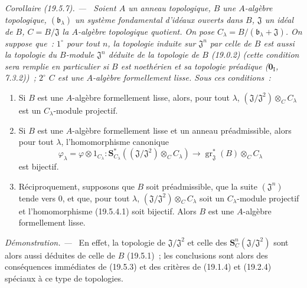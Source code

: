 \documentclass[10pt,oneside]{book}
\makeatletter
\newcommand{\gr}{\operatorname{gr}}
\newcommand{\setmanualcurrentlabel}[1]{\def\@currentlabel{#1}}
\newcommand{\oldpage}[2][]{%
  \setcounter{footnote}{0}%
  \marginpar{\scriptsize\textbf{#1}~|~#2}\ignorespaces}
\newenvironment{corollary}[1][]{%
  \setmanualcurrentlabel{#1}\par\medskip\noindent\itshape Corollaire (#1). ---\ }{\par}
\newenvironment{proof}{%
  \par\medskip\noindent\textit{Démonstration. ---\ }}{\par}
\makeatother
\begin{document}
\begin{corollary}[19.5.7]
\label{0.19.5.7-fr}
Soient $A$ un anneau topologique, $B$ une $A$-algèbre topologique,
$(\mathfrak b_\lambda)$ un système fondamental d'idéaux ouverts dans $B$,
$\mathfrak J$ un idéal de $B$, $C=B/\mathfrak J$ la $A$-algèbre topologique
quotient. On pose $C_\lambda=B/(\mathfrak b_\lambda+\mathfrak J)$. On suppose
que~: $1^\circ$ pour tout $n$, la topologie induite sur $\mathfrak J^n$ par
celle de $B$ est aussi la topologie du $B$-module $\mathfrak J^n$ déduite de
la topologie de $B$ (19.0.2) (cette condition sera remplie en particulier si
$B$ est noethérien et sa topologie préadique ($\mathbf 0_{\mathrm I}$,
7.3.2))~; $2^\circ$ $C$ est une $A$-algèbre formellement lisse. Sous ces
conditions~:
\begin{enumerate}
  \item[\rm(i)] Si $B$ est une $A$-algèbre formellement lisse, alors, pour tout
  $\lambda$, $(\mathfrak J/\mathfrak J^2)\otimes_C C_\lambda$ est un
  $C_\lambda$-module projectif.
  \item[\rm(ii)] Si $B$ est une $A$-algèbre formellement lisse et un anneau
  préadmissible, alors pour tout $\lambda$, l'homomorphisme canonique
  \begin{equation}
  \label{0.19.5.7.1-fr}
    \varphi_\lambda=\varphi\otimes 1_{C_\lambda}:
    \mathbf S_{C_\lambda}^*((\mathfrak J/\mathfrak J^2)\otimes_C C_\lambda)
    \longrightarrow\gr_{\mathfrak J}^*(B)\otimes_C C_\lambda
    \tag{19.5.7.1}
  \end{equation}
  est bijectif.

  \oldpage[0\textsubscript{IV-1}]{100}

  \item[\rm(iii)] Réciproquement, supposons que $B$ soit préadmissible, que la
  suite $(\mathfrak J^n)$ tende vers $0$, et que, pour tout $\lambda$,
  $(\mathfrak J/\mathfrak J^2)\otimes_C C_\lambda$ soit un $C_\lambda$-module
  projectif et l'homomorphisme (19.5.4.1) soit bijectif. Alors $B$ est une
  $A$-algèbre formellement lisse.
\end{enumerate}
\end{corollary}

\begin{proof}
En effet, la topologie de $\mathfrak J/\mathfrak J^2$ et celle des
$\mathbf S_C^n(\mathfrak J/\mathfrak J^2)$ sont alors aussi déduites de celle
de $B$ (19.5.1)~; les conclusions sont alors des conséquences immédiates de
(19.5.3) et des critères de (19.1.4) et (19.2.4) spéciaux à ce type de
topologies.
\end{proof}
\end{document}
